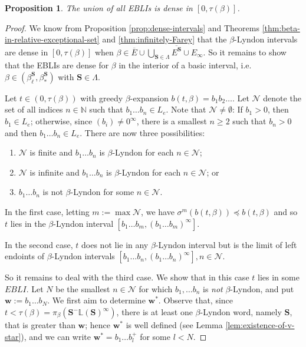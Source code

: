 \documentclass[11pt]{amsart}
\newtheorem{proposition}[theorem]{Proposition}
\theoremstyle{definition}
\theoremstyle{remark}
\numberwithin{equation}{section}
\newcommand{\N}{\ensuremath{\mathbb{N}}}
\renewcommand{\L}{\ensuremath{\mathbb{L}}}
\newcommand{\cs}{ {\mathbf{S}}}
\newcommand{\w}{\mathbf{w}}
\newcommand{\f}{\infty}
\newcommand{\lle}{\preccurlyeq}
\newcommand{\si}{\sigma}
\newcommand{\La}{\Lambda}
\begin{document}
\begin{proposition} \label{prop:dense-EBLIs}
The union of all EBLIs is dense in $[0,\tau(\beta)]$.
\end{proposition}

\begin{proof}
We know from Proposition \ref{prop:dense-intervals} and Theorems \ref{thm:beta-in-relative-exceptional-set} and \ref{thm:infinitely-Farey} that the $\beta$-Lyndon intervals are dense in $[0,\tau(\beta)]$ when $\beta\in \overline{E}\cup \bigcup_{\cs\in\La}\overline{E^\cs}\cup E_\f$. So it remains to show that the EBLIs are dense for $\beta$ in the interior of a basic interval, i.e. $\beta\in(\beta_\ell^\cs,\beta_*^\cs)$ with $\cs\in\La$.

Let $t\in{(0,\tau(\beta))}$ with greedy $\beta$-expansion $b(t,\beta)=b_1b_2\dots$. Let $\mathcal{N}$ denote the set of all indices $n\in\N$ such that {$b_1\dots b_n\in L_e$. Note that $\mathcal{N}\neq\emptyset$: If $b_1>0$, then $b_1\in L_e$; otherwise, since $(b_i)\neq 0^\f$, there is a smallest $n\geq 2$ such that $b_n>0$ and then $b_1\dots b_n\in L_e$.} There are now three possibilities:
\begin{enumerate}[(1)]
\item $\mathcal{N}$ is finite and $b_1\dots b_n$ is $\beta$-Lyndon for each $n\in\mathcal{N}$;
\item $\mathcal{N}$ is infinite and $b_1\dots b_n$ is $\beta$-Lyndon for each $n\in\mathcal{N}$; or
\item $b_1\dots b_n$ is not $\beta$-Lyndon for some $n\in\mathcal{N}$.
\end{enumerate}
In the first case, letting $m:=\max\mathcal{N}$, we have $\si^{m}(b(t,\beta))\lle b(t,\beta)$ and so $t$ lies in the $\beta$-Lyndon interval $[b_1\dots b_{m},(b_1\dots b_{m})^\f]$.

In the second case, $t$ does not lie in any $\beta$-Lyndon interval but is the limit of left endoints of $\beta$-Lyndon intervals $[b_1\dots b_n,(b_1\dots b_n)^\f], n\in\mathcal{N}$.

So it remains to deal with the third case. We show that in this case $t$ lies in some $EBLI$. Let $N$ be the smallest $n\in\mathcal{N}$ for which $b_1,\dots b_n$ is {\em not} $\beta$-Lyndon, and put $\w:=b_1\dots b_{N}$. We first aim to determine $\w^*$. Observe that, since $t<\tau(\beta)=\pi_\beta(\cs^-\L(\cs)^\f)$, there is at least one $\beta$-Lyndon word, namely $\cs$, that is greater than $\w$; hence $\w^*$ is well defined {(see Lemma \ref{lem:existence-of-v-star})}, and we can write $\w^*=b_1\dots b_l^+$ for some $l<N$.


\end{proof}
\end{document}

